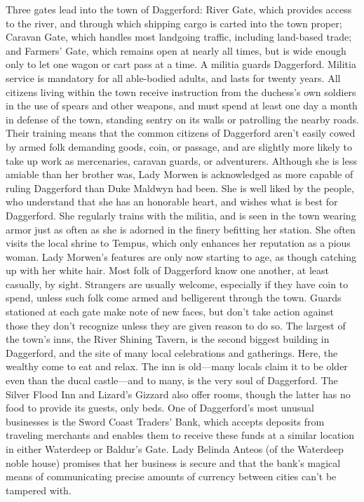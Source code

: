 \documentclass[10pt,a4paper,twoside,twocolumn,openany,bg=print,nodeprecatedcode]{dndbook}
\begin{document}
Three gates lead into the town of Daggerford: River Gate, which provides access to the river, and through which shipping cargo is carted into the town proper; Caravan Gate, which handles most landgoing traffic, including land-based trade; and Farmers' Gate, which remains open at nearly all times, but is wide enough only to let one wagon or cart pass at a time.
A militia guards Daggerford. Militia service is mandatory for all able-bodied adults, and lasts for twenty years. All citizens living within the town receive instruction from the duchess's own soldiers in the use of spears and other weapons, and must spend at least one day a month in defense of the town, standing sentry on its walls or patrolling the nearby roads. Their training means that the common citizens of Daggerford aren't easily cowed by armed folk demanding goods, coin, or passage, and are slightly more likely to take up work as mercenaries, caravan guards, or adventurers.
Although she is less amiable than her brother was, Lady Morwen is acknowledged as more capable of ruling Daggerford than Duke Maldwyn had been. She is well liked by the people, who understand that she has an honorable heart, and wishes what is best for Daggerford. She regularly trains with the militia, and is seen in the town wearing armor just as often as she is adorned in the finery befitting her station. She often visits the local shrine to Tempus, which only enhances her reputation as a pious woman. Lady Morwen's features are only now starting to age, as though catching up with her white hair.
Most folk of Daggerford know one another, at least casually, by sight. Strangers are usually welcome, especially if they have coin to spend, unless such folk come armed and belligerent through the town. Guards stationed at each gate make note of new faces, but don't take action against those they don't recognize unless they are given reason to do so.
The largest of the town's inns, the River Shining Tavern, is the second biggest building in Daggerford, and the site of many local celebrations and gatherings. Here, the wealthy come to eat and relax. The inn is old—many locals claim it to be older even than the ducal castle—and to many, is the very soul of Daggerford. The Silver Flood Inn and Lizard's Gizzard also offer rooms, though the latter has no food to provide its guests, only beds.
One of Daggerford's most unusual businesses is the Sword Coast Traders' Bank, which accepts deposits from traveling merchants and enables them to receive these funds at a similar location in either Waterdeep or Baldur's Gate. Lady Belinda Anteos (of the Waterdeep noble house) promises that her business is secure and that the bank's magical means of communicating precise amounts of currency between cities can't be tampered with.
\end{document}
